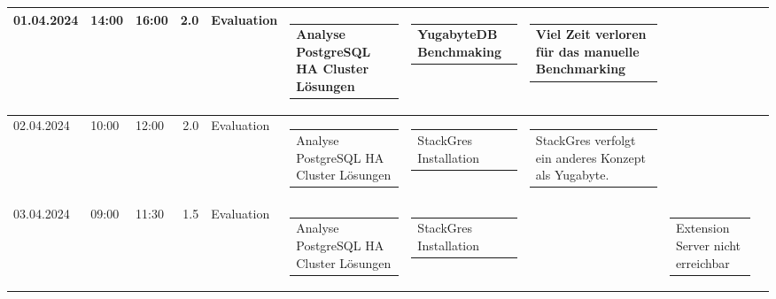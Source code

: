 {\begin{longtable}[H]{lllrllllll}
01.04.2024 & 14:00 & 16:00 & 2.0 & Evaluation & \begin{tabular}[c]{@{}l@{}}Analyse PostgreSQL HA Cluster Lösungen\end{tabular} & \begin{tabular}[c]{@{}l@{}}YugabyteDB Benchmaking\end{tabular} & \begin{tabular}[c]{@{}l@{}}Viel Zeit verloren für das manuelle Benchmarking\end{tabular} & \begin{tabular}[c]{@{}l@{}}\end{tabular} & \begin{tabular}[c]{@{}l@{}}\end{tabular} \\ \midrule
02.04.2024 & 10:00 & 12:00 & 2.0 & Evaluation & \begin{tabular}[c]{@{}l@{}}Analyse PostgreSQL HA Cluster Lösungen\end{tabular} & \begin{tabular}[c]{@{}l@{}}StackGres Installation\end{tabular} & \begin{tabular}[c]{@{}l@{}}StackGres verfolgt ein anderes Konzept als Yugabyte.\end{tabular} & \begin{tabular}[c]{@{}l@{}}\end{tabular} & \begin{tabular}[c]{@{}l@{}}\end{tabular} \\ \midrule
03.04.2024 & 09:00 & 11:30 & 1.5 & Evaluation & \begin{tabular}[c]{@{}l@{}}Analyse PostgreSQL HA Cluster Lösungen\end{tabular} & \begin{tabular}[c]{@{}l@{}}StackGres Installation\end{tabular} & \begin{tabular}[c]{@{}l@{}}\end{tabular} & \begin{tabular}[c]{@{}l@{}}Extension Server nicht erreichbar\end{tabular} & \begin{tabular}[c]{@{}l@{}}\end{tabular} \\ \midrule

\end{longtable}}
